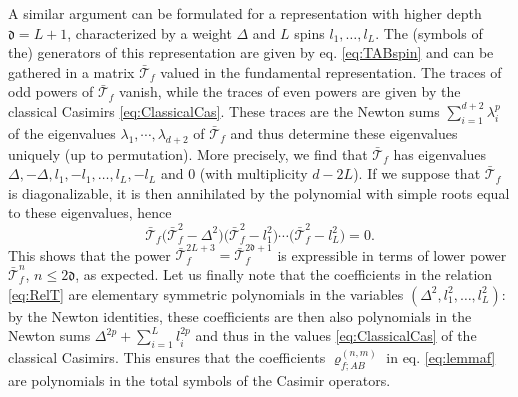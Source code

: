 \documentclass{article}
\def\dep{\mathfrak{d}}
\begin{document}
A similar argument can be formulated for a representation with higher depth $\dep=L+1$, characterized by a weight $\Delta$ and $L$ spins $l_1,\dots,l_L$. The (symbols of the) generators of this representation are given by eq. \eqref{eq:TABspin} and can be gathered in a matrix $\bar{\mathcal{T}}_f$ valued in the fundamental representation. The traces of odd powers of $\bar{\mathcal{T}}_f$ vanish, while the traces of even powers are given by the classical Casimirs \eqref{eq:ClassicalCas}. These traces are the Newton sums $\sum_{i=1}^{d+2} \lambda_i^p$ of the eigenvalues $\lambda_1,\cdots,\lambda_{d+2}$ of $\bar{\mathcal{T}}_f$ and thus determine these eigenvalues uniquely (up to permutation). More precisely, we find that $\bar{\mathcal{T}}_f$ has eigenvalues $\Delta,-\Delta,l_1,-l_1,\dots,l_L,-l_L$ and $0$ (with multiplicity $d-2L$). If we suppose that $\bar{\mathcal{T}}_f$ is diagonalizable, it is then annihilated by the polynomial with simple roots equal to these eigenvalues, hence
\begin{equation}\label{eq:RelT}
\bar{\mathcal{T}}_f \bigl( \bar{\mathcal{T}}_f^2 - \Delta^2 \bigr) \bigl( \bar{\mathcal{T}}_f^2 - l_1^2 \bigr)\cdots\bigl( \bar{\mathcal{T}}_f^2 - l_L^2 \bigr) = 0.
\end{equation}
This shows that the power $\bar{\mathcal{T}}_f^{2L+3}=\bar{\mathcal{T}}_f^{2\dep+1}$ is expressible in terms of lower power $\bar{\mathcal{T}}_f^n$, $n\leq 2\dep$, as expected. Let us finally note that the coefficients in the relation \eqref{eq:RelT} are elementary symmetric polynomials in the variables $(\Delta^2,l_1^2,\dots,l_L^2)$: by the Newton identities, these coefficients are then also polynomials in the Newton sums $\Delta^{2p}+\sum_{i=1}^L l_i^{2p}$ and thus in the values \eqref{eq:ClassicalCas} of the classical Casimirs. This ensures that the coefficients $\varrho^{(n,m)}_{f;AB}$ in eq. \eqref{eq:lemmaf} are polynomials in the total symbols of the Casimir operators.
\end{document}
